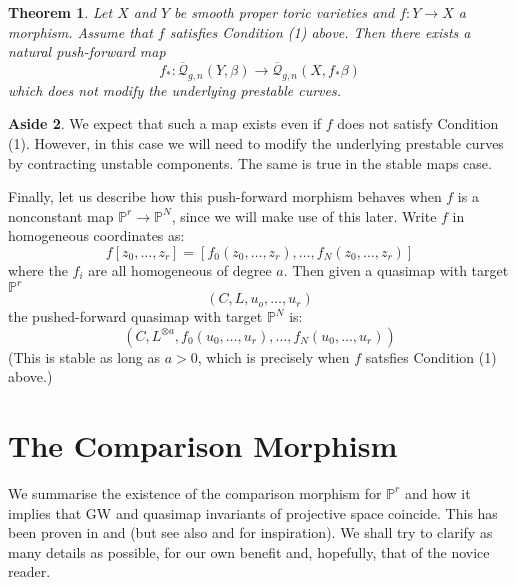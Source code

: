 \documentclass[11pt]{amsart}
\newcommand{\Q}[4]{\overline{\mathcal Q}_{#1,#2}(#3,#4)}
\newcommand{\PP}{\mathbb P}
\renewcommand{\to}{\rightarrow}
\theoremstyle{plain}
\newtheorem{thm}{Theorem}[section]
\theoremstyle{definition}
\newtheorem{aside}[thm]{Aside}
\begin{document}
\begin{thm} Let $X$ and $Y$ be smooth proper toric varieties and $f : Y \to X$ a morphism. Assume that $f$ satisfies Condition (1) above. Then there exists a natural push-forward map
\begin{equation*} f_* : \Q{g}{n}{Y}{\beta} \to \Q{g}{n}{X}{f_* \beta} \end{equation*}
which does not modify the underlying prestable curves.\end{thm}

\begin{aside} We expect that such a map exists even if $f$ does not satisfy Condition (1). However, in this case we will need to modify the underlying prestable curves by contracting unstable components. The same is true in the stable maps case. \end{aside}

Finally, let us describe how this push-forward morphism behaves when $f$ is a nonconstant map $\PP^r \to \PP^N$, since we will make use of this later. Write $f$ in homogeneous coordinates as:
\begin{equation*} f[z_0, \ldots, z_r] = [f_0(z_0, \ldots, z_r), \ldots, f_N(z_0, \ldots, z_r)] \end{equation*}
where the $f_i$ are all homogeneous of degree $a$. Then given a quasimap with target $\PP^r$
\begin{equation*} (C, L, u_o, \ldots, u_r) \end{equation*}
the pushed-forward quasimap with target $\PP^N$ is:
\begin{equation*} (C, L^{\otimes a}, f_0(u_0, \ldots, u_r) , \ldots, f_N(u_0, \ldots, u_r)) \end{equation*}
(This is stable as long as $a > 0$, which is precisely when $f$ satsfies Condition (1) above.)

\section{The Comparison Morphism}

We summarise the existence of the comparison morphism for $\PP^r$ and how it implies that GW and quasimap invariants of projective space coincide. This has been proven in \cite[Theorem 3]{MOP} and \cite[Section 4.3]{Manolache-Push} (but see also \cite[Proposition 4.1]{Bertram} and \cite[Theorem 7.1]{Popa-Roth} for inspiration). We shall try to clarify as many details as possible, for our own benefit and, hopefully, that of the novice reader.
\end{document}
